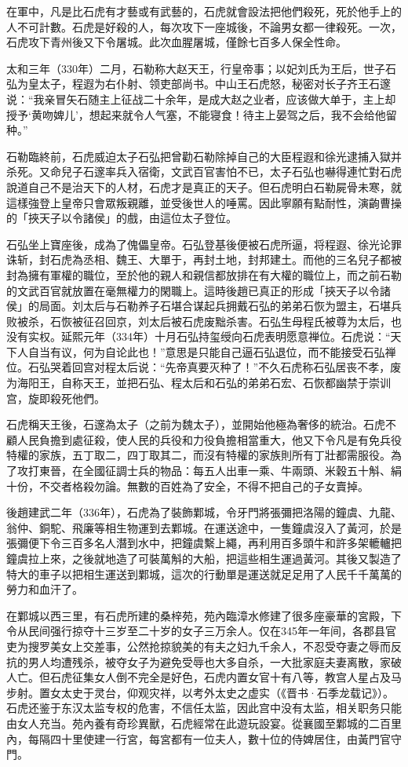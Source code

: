 在軍中，凡是比石虎有才藝或有武藝的，石虎就會設法把他們殺死，死於他手上的人不可計數。石虎是好殺的人，每次攻下一座城後，不論男女都一律殺死。一次，石虎攻下青州後又下令屠城。此次血腥屠城，僅餘七百多人保全性命。

太和三年（330年）二月，石勒称大赵天王，行皇帝事；以妃刘氏为王后，世子石弘为皇太子，程遐为右仆射、领吏部尚书。中山王石虎怒，秘密对长子齐王石邃说：“我亲冒矢石随主上征战二十余年，是成大赵之业者，应该做大单于，主上却授予‘黄吻婢儿’，想起来就令人气塞，不能寝食！待主上晏驾之后，我不会给他留种。”

石勒臨終前，石虎威迫太子石弘把曾勸石勒除掉自己的大臣程遐和徐光逮捕入獄并杀死。又命兒子石邃率兵入宿衛，文武百官害怕不已，太子石弘也嚇得連忙對石虎說道自己不是治天下的人材，石虎才是真正的天子。但石虎明白石勒屍骨未寒，就這樣強登上皇帝只會眾叛親離，並受後世人的唾罵。因此寧願有點耐性，演齣曹操的「挾天子以令諸侯」的戲，由這位太子登位。

石弘坐上寶座後，成為了傀儡皇帝。石弘登基後便被石虎所逼，将程遐、徐光论罪诛斩，封石虎為丞相、魏王、大單于，再封土地，封邦建土。而他的三名兒子都被封為擁有軍權的職位，至於他的親人和親信都放排在有大權的職位上，而之前石勒的文武百官就放置在毫無權力的閑職上。這時後趙已真正的形成「挾天子以令諸侯」的局面。刘太后与石勒养子石堪合谋起兵拥戴石弘的弟弟石恢为盟主，石堪兵败被杀，石恢被征召回京，刘太后被石虎废黜杀害。石弘生母程氏被尊为太后，也没有实权。延熙元年（334年）十月石弘持玺绶向石虎表明愿意禅位。石虎说：“天下人自当有议，何为自论此也！”意思是只能自己逼石弘退位，而不能接受石弘禅位。石弘哭着回宫对程太后说：“先帝真要灭种了！”不久石虎称石弘居丧不孝，废为海阳王，自称天王，並把石弘、程太后和石弘的弟弟石宏、石恢都幽禁于崇训宫，旋即殺死他們。

石虎稱天王後，石邃為太子（之前为魏太子），並開始他極為奢侈的統治。石虎不顧人民負擔到處征殺，使人民的兵役和力役負擔相當重大，他又下令凡是有免兵役特權的家族，五丁取二，四丁取其二，而沒有特權的家族則所有丁壯都需服役。為了攻打東晉，在全國征調士兵的物品：每五人出車一乘、牛兩頭、米穀五十斛、絹十份，不交者格殺勿論。無數的百姓為了安全，不得不把自己的子女賣掉。

後趙建武二年（336年），石虎為了裝飾鄴城，令牙門將張彌把洛陽的鐘虞、九龍、翁仲、銅駝、飛廉等相生物運到去鄴城。在運送途中，一隻鐘虞沒入了黃河，於是張彌便下令三百多名人潛到水中，把鐘虞繫上繩，再利用百多頭牛和許多架轆轤把鐘虞拉上來，之後就地造了可裝萬斛的大船，把這些相生運過黃河。其後又製造了特大的車子以把相生運送到鄴城，這次的行動單是運送就足足用了人民千千萬萬的勞力和血汗了。

在鄴城以西三里，有石虎所建的桑梓苑，苑內臨漳水修建了很多座豪華的宮殿，下令从民间强行掠夺十三岁至二十岁的女子三万余人。仅在345年一年间，各郡县官吏为搜罗美女上交差事，公然抢掠貌美的有夫之妇九千余人，不忍受夺妻之辱而反抗的男人均遭残杀，被夺女子为避免受辱也大多自杀，一大批家庭夫妻离散，家破人亡。但石虎征集女人倒不完全是好色，石虎内置女官十有八等，教宫人星占及马步射。置女太史于灵台，仰观灾祥，以考外太史之虚实（《晋书·石季龙载记》）。石虎还鉴于东汉太监专权的危害，不信任太监，因此宫中没有太监，相关职务只能由女人充当。苑內養有奇珍異獸，石虎經常在此遊玩設宴。從襄國至鄴城的二百里內，每隔四十里使建一行宮，每宮都有一位夫人，數十位的侍婢居住，由黃門官守門。

